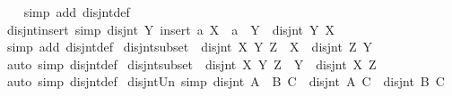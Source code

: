 \begin{isabellebody}
%
\isadelimproof
\ \ %
\endisadelimproof
%
\isatagproof
{}\isamarkupfalse%
\ {\isacharparenleft}{\kern0pt}simp\ add{\isacharcolon}{\kern0pt}\ disjnt{\isacharunderscore}{\kern0pt}def{\isacharparenright}{\kern0pt}%
\endisatagproof
{\isafoldproof}%
%
\isadelimproof
\isanewline
%
\endisadelimproof
\isanewline
{}\isamarkupfalse%
\ disjnt{\isacharunderscore}{\kern0pt}insert{}\ {\isacharbrackleft}{\kern0pt}simp{\isacharbrackright}{\kern0pt}{\isacharcolon}{\kern0pt}\ {\isachardoublequoteopen}disjnt\ Y\ {\isacharparenleft}{\kern0pt}insert\ a\ X{\isacharparenright}{\kern0pt}\ {\isasymlongleftrightarrow}\ a\ {\isasymnotin}\ Y\ {\isasymand}\ disjnt\ Y\ X{\isachardoublequoteclose}\isanewline
%
\isadelimproof
\ \ %
\endisadelimproof
%
\isatagproof
{}\isamarkupfalse%
\ {\isacharparenleft}{\kern0pt}simp\ add{\isacharcolon}{\kern0pt}\ disjnt{\isacharunderscore}{\kern0pt}def{\isacharparenright}{\kern0pt}%
\endisatagproof
{\isafoldproof}%
%
\isadelimproof
\isanewline
%
\endisadelimproof
\isanewline
{}\isamarkupfalse%
\ disjnt{\isacharunderscore}{\kern0pt}subset{}\ {\isacharcolon}{\kern0pt}\ {\isachardoublequoteopen}{\isasymlbrakk}disjnt\ X\ Y{\isacharsemicolon}{\kern0pt}\ Z\ {\isasymsubseteq}\ X{\isasymrbrakk}\ {\isasymLongrightarrow}\ disjnt\ Z\ Y{\isachardoublequoteclose}\isanewline
%
\isadelimproof
\ \ %
\endisadelimproof
%
\isatagproof
{}\isamarkupfalse%
\ {\isacharparenleft}{\kern0pt}auto\ simp{\isacharcolon}{\kern0pt}\ disjnt{\isacharunderscore}{\kern0pt}def{\isacharparenright}{\kern0pt}%
\endisatagproof
{\isafoldproof}%
%
\isadelimproof
\isanewline
%
\endisadelimproof
\isanewline
{}\isamarkupfalse%
\ disjnt{\isacharunderscore}{\kern0pt}subset{}\ {\isacharcolon}{\kern0pt}\ {\isachardoublequoteopen}{\isasymlbrakk}disjnt\ X\ Y{\isacharsemicolon}{\kern0pt}\ Z\ {\isasymsubseteq}\ Y{\isasymrbrakk}\ {\isasymLongrightarrow}\ disjnt\ X\ Z{\isachardoublequoteclose}\isanewline
%
\isadelimproof
\ \ %
\endisadelimproof
%
\isatagproof
{}\isamarkupfalse%
\ {\isacharparenleft}{\kern0pt}auto\ simp{\isacharcolon}{\kern0pt}\ disjnt{\isacharunderscore}{\kern0pt}def{\isacharparenright}{\kern0pt}%
\endisatagproof
{\isafoldproof}%
%
\isadelimproof
\isanewline
%
\endisadelimproof
\isanewline
{}\isamarkupfalse%
\ disjnt{\isacharunderscore}{\kern0pt}Un{}\ {\isacharbrackleft}{\kern0pt}simp{\isacharbrackright}{\kern0pt}{\isacharcolon}{\kern0pt}\ {\isachardoublequoteopen}disjnt\ {\isacharparenleft}{\kern0pt}A\ {\isasymunion}\ B{\isacharparenright}{\kern0pt}\ C\ {\isasymlongleftrightarrow}\ disjnt\ A\ C\ {\isasymand}\ disjnt\ B\ C{\isachardoublequoteclose}\isanewline

\end{isabellebody}

